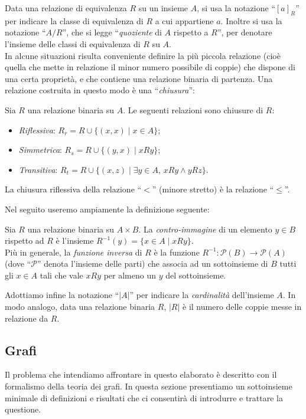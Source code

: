 Data una relazione di equivalenza $R$ su un insieme $A$, si usa la notazione ``$[a]_R$'' per indicare la classe di equivalenza di $R$ a cui appartiene $a$. Inoltre si usa la notazione ``$A/R$'', che si legge ``\emph{quoziente} di $A$ rispetto a $R$'', per denotare l'insieme delle classi di equivalenza di $R$ su $A$.\\
In alcune situazioni risulta conveniente definire la più piccola relazione (cioè quella che mette in relazione il minor numero possibile di coppie) che dispone di una certa proprietà, e che contiene una relazione binaria di partenza. Una relazione costruita in questo modo è una ``\emph{chiusura}'':
\begin{definition}
	Sia $R$ una relazione binaria su $A$. Le seguenti relazioni sono chiusure di $R$:
    \begin{itemize}
        \item \emph{Riflessiva}: $R_r = R \cup \{(x,x) \mid x \in A\}$;
        \item \emph{Simmetrica}: $R_s = R \cup \{(y,x) \mid x R y\}$;
        \item \emph{Transitiva}: $R_t = R \cup \{(x,z) \mid \exists y \in A,\, x R y \land y R z\}$.
    \end{itemize}
\end{definition}
\begin{example}
    La chiusura riflessiva della relazione ``$<$'' (minore stretto) è la relazione ``$\leq$''.
\end{example}
Nel seguito useremo ampiamente la definizione seguente:
\begin{definition}
    Sia $R$ una relazione binaria su $A \times B$. La \emph{contro-immagine} di un elemento $y \in B$ rispetto ad $R$ è l'insieme $R^{-1}(y) = \{x \in A \mid x R y\}$.\\
    Più in generale, la \emph{funzione inversa} di $R$ è la funzione $R^{-1} : \mathcal{P}(B) \to \mathcal{P}(A)$ (dove ``$\mathcal{P}$'' denota l'insieme delle parti) che associa ad un sottoinsieme di $B$ tutti gli $x \in A$ tali che vale $x R y$ per almeno un $y$ del sottoinsieme.
\end{definition}
Adottiamo infine la notazione ``$|A|$'' per indicare la \emph{cardinalità} dell'insieme $A$. In modo analogo, data una relazione binaria $R$, $|R|$ è il numero delle coppie messe in relazione da $R$.

\subsection{Grafi}
Il problema che intendiamo affrontare in questo elaborato è descritto con il formalismo della teoria dei grafi. In questa sezione presentiamo un sottoinsieme minimale di definizioni e risultati che ci consentirà di introdurre e trattare la questione.

